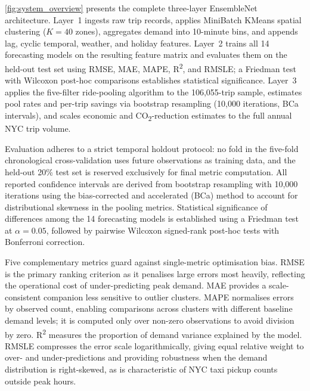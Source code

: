 \documentclass[a4paper,fleqn]{cas-dc}
\begin{document}
\autoref{fig:system_overview} presents the complete three-layer EnsembleNet architecture.  Layer~1 ingests raw trip records, applies MiniBatch KMeans spatial clustering ($K{=}40$ zones), aggregates demand into 10-minute bins, and appends lag, cyclic temporal, weather, and holiday features.  Layer~2 trains all 14 forecasting models on the resulting feature matrix and evaluates them on the held-out test set using RMSE, MAE, MAPE, R\textsuperscript{2}, and RMSLE; a Friedman test with Wilcoxon post-hoc comparisons establishes statistical significance.  Layer~3 applies the five-filter ride-pooling algorithm to the 106,055-trip sample, estimates pool rates and per-trip savings via bootstrap resampling (10,000 iterations, BCa intervals), and scales economic and CO\textsubscript{2}-reduction estimates to the full annual NYC trip volume.

Evaluation adheres to a strict temporal holdout protocol: no fold in the five-fold chronological cross-validation uses future observations as training data, and the held-out 20\% test set is reserved exclusively for final metric computation.  All reported confidence intervals are derived from bootstrap resampling with 10,000 iterations using the bias-corrected and accelerated (BCa) method to account for distributional skewness in the pooling metrics.  Statistical significance of differences among the 14 forecasting models is established using a Friedman test at $\alpha{=}0.05$, followed by pairwise Wilcoxon signed-rank post-hoc tests with Bonferroni correction.

Five complementary metrics guard against single-metric optimisation bias.  RMSE is the primary ranking criterion as it penalises large errors most heavily, reflecting the operational cost of under-predicting peak demand.  MAE provides a scale-consistent companion less sensitive to outlier clusters.  MAPE normalises errors by observed count, enabling comparisons across clusters with different baseline demand levels; it is computed only over non-zero observations to avoid division by zero.  R\textsuperscript{2} measures the proportion of demand variance explained by the model.  RMSLE compresses the error scale logarithmically, giving equal relative weight to over- and under-predictions and providing robustness when the demand distribution is right-skewed, as is characteristic of NYC taxi pickup counts outside peak hours.
\end{document}
